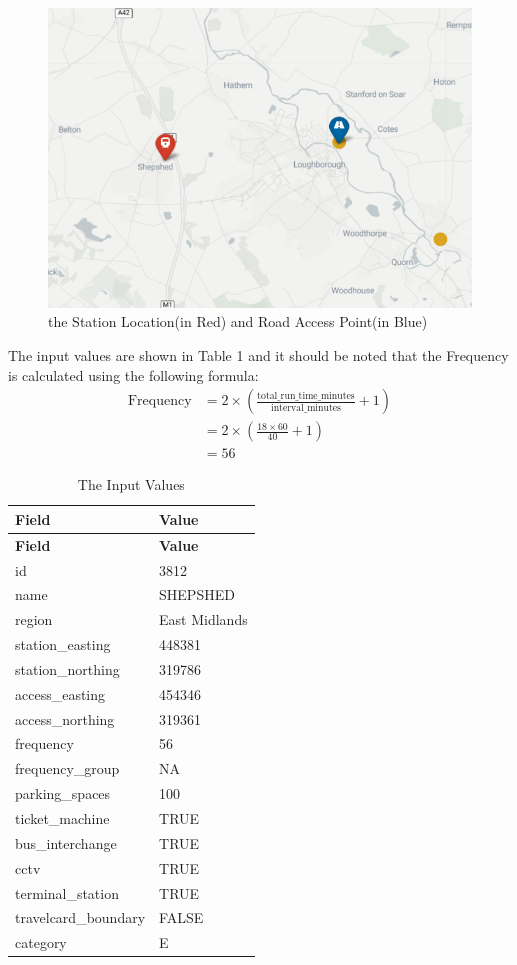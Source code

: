\documentclass[letterpaper,12pt,leqno]{article}
\begin{document}
	\begin{figure}[H]
		\centering
		\includegraphics[width=0.8\linewidth]{figure/image-20240203120054780.png}
		\caption{the Station Location(in Red) and Road Access Point(in Blue)}
		\label{fig:demandinput}
	\end{figure}
	The input values are shown in Table 1 and it should be noted that the
	Frequency is calculated using the following formula:
	\begin{align*}
		\text{Frequency} &= 2 \times \left(\frac{\text{total\_run\_time\_minutes}}{\text{interval\_minutes}} + 1\right) \\
		&= 2 \times \left(\frac{18 \times 60}{40} + 1\right) \\
		&= 56
	\end{align*}
	
	
		
		\begin{longtable}{ll}
			\caption{The Input Values}\\
			\hline
			\textbf{Field} & \textbf{Value} \\
			\hline
			\endfirsthead
			
			\hline
			\textbf{Field} & \textbf{Value} \\
			\hline
			\endhead
			
			\hline
			\endfoot
			
			\hline
			\endlastfoot
			
			id & 3812 \\
			name & SHEPSHED \\
			region & East Midlands \\
			station\_easting & 448381 \\
			station\_northing & 319786 \\
			access\_easting & 454346 \\
			access\_northing & 319361 \\
			frequency & 56 \\
			frequency\_group & NA \\
			parking\_spaces & 100 \\
			ticket\_machine & TRUE \\
			bus\_interchange & TRUE \\
			cctv & TRUE \\
			terminal\_station & TRUE \\
			travelcard\_boundary & FALSE \\
			category & E \\
		\end{longtable}
\end{document}
